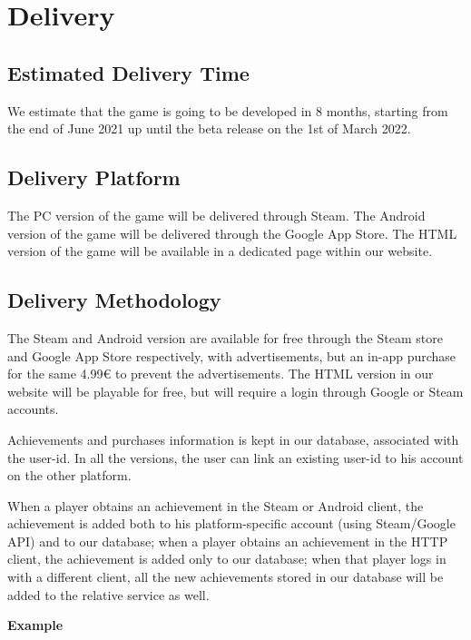 \section{Delivery}
\subsection{Estimated Delivery Time}
We estimate that the game is going to be developed in 8 months, starting from the end of June 2021 up until the beta release on the 1st of March 2022.

\subsection{Delivery Platform}
The PC      version of the game will be delivered through Steam. 
The Android version of the game will be delivered through the Google App Store.
The HTML    version of the game will be available in a dedicated page within our website.

\subsection{Delivery Methodology}
The Steam and Android version are available for free through the Steam store and Google App Store respectively, with advertisements, but an in-app purchase for the same 4.99€ to prevent the advertisements.
The HTML version in our website will be playable for free, but will require a login through Google or Steam accounts.

Achievements and purchases information is kept in our database, associated with the user-id. 
In all the versions, the user can link an existing user-id to his account on the other platform. 

When a player obtains an achievement in the Steam or Android client, the achievement is added both to his platform-specific account (using Steam/Google API) and to our database; when a player obtains an achievement in the HTTP client, the achievement is added only to our database; when that player logs in with a different client, all the new achievements stored in our database will be added to the relative service as well.

\textbf{Example}


